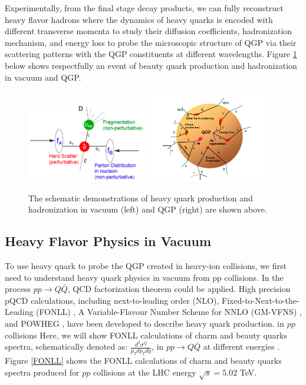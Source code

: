 Experimentally, from the final stage decay products, we can fully reconstruct heavy flavor hadrons where the dynamics of heavy quarks is encoded with different transverse momenta to study their diffusion coefficients, hadronization mechanism, and energy loss to probe the microscopic structure of QGP via their scattering patterns with the QGP constituents at different wavelengths. Figure \ref{HQ} below shows respectfully an event of beauty quark production and hadronization in vacuum and QGP.

 \begin{figure}[hbtp]
\begin{center}
\includegraphics[width=0.46\textwidth]{Figures/Chapter1/HQVacuum.png}
\includegraphics[width=0.48\textwidth]{Figures/Chapter1/HQQGP.png}
\caption{The schematic demonstrations of heavy quark production and hadronization in vacuum (left) and QGP (right) are shown above.}
\label{HQ}
\end{center}
\end{figure}   



\subsection{Heavy Flavor Physics in Vacuum}

To use heavy quark to probe the QGP created in heavy-ion collisions, we first need to understand heavy quark physics in vacuum from pp collisions. In the process $pp \rightarrow Q \bar Q$, QCD factorization theorem could be applied. High precision pQCD calculations, including next-to-leading order (NLO), Fixed-to-Next-to-the-Leading (FONLL) \cite{FONLLRef1,FONLLRef2}, A Variable-Flavour Number Scheme for NNLO (GM-VFNS) \cite{GM-VFNSRef}, and POWHEG \cite{POWHEGRef}, have been developed to describe heavy quark production. in $pp$ collisions Here, we will show FONLL calculations of charm and beauty quarks spectra, schematically denoted as: $\frac{d^2\sigma^Q}{p_T dp_T dy}$, in $pp \rightarrow Q  \bar Q$ at different energies \cite{FONLLCal}. Figure \ref{FONLL} shows the FONLL calculations of charm and beauty quarks spectra produced for $pp$ collisions at the LHC energy $\sqrt s = 5.02$ TeV.

